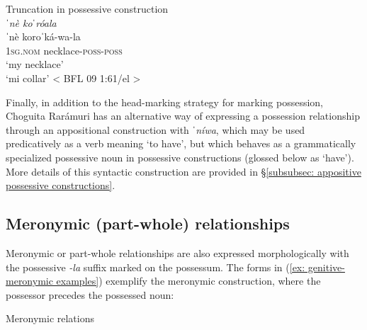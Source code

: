 \ea\label{ex: truncation in genitive-possessive}
{Truncation in possessive construction}\\

    {\textit{ˈnè  koˈróala}}\\
    \gll    ˈnè koroˈká-wa-la\\
            \textsc{1sg.nom} necklace\textsc{-poss-poss} \\
    \glt    ‘my necklace’\\
    \glt    ‘mi collar’ < BFL 09 1:61/el > \\

\z

Finally, in addition to the head-marking strategy for marking possession, Choguita Rarámuri has an alternative way of expressing a possession relationship through an appositional construction with \textit{ˈníwa}, which may be used predicatively as a verb meaning `to have', but which behaves as a grammatically specialized possessive noun in possessive constructions (glossed below as `have'). More details of this syntactic construction are provided in §\ref{subsubsec: appositive possessive constructions}.

\subsection{Meronymic (part-whole) relationships}
\label{subsec: meronymic}

Meronymic or part-whole relationships are also expressed morphologically with the possessive \textit{-la} suffix marked on the possessum. The forms in (\ref{ex: genitive-meronymic examples}) exemplify the meronymic construction, where the possessor precedes the possessed noun:

\ea\label{ex: genitive-meronymic examples}
{Meronymic relations}\\

    \z
\z

